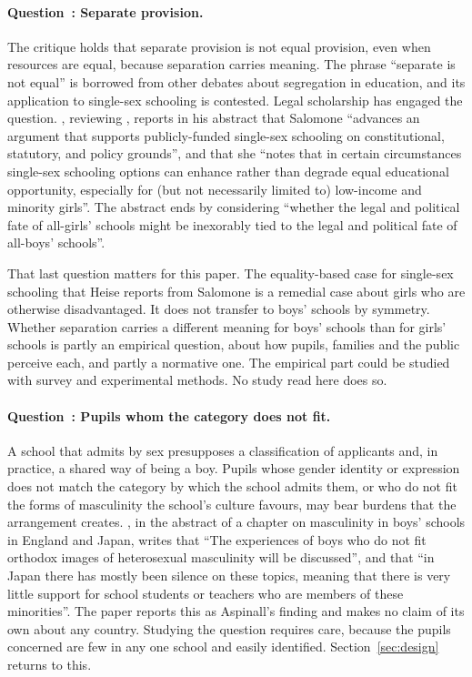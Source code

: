 \documentclass[11pt]{article}
\newcommand{\srcq}[2]{``#2''}
\newcounter{eqq}
\newcommand{\eqq}[1]{\refstepcounter{eqq}\paragraph{Question~\theeqq: #1.}}
\begin{document}
\eqq{Separate provision}\label{eq:separate}
The critique holds that separate provision is not equal provision, even when resources are equal, because separation carries meaning. The phrase ``separate is not equal'' is borrowed from other debates about segregation in education, and its application to single-sex schooling is contested. Legal scholarship has engaged the question. \citet{heise2004}, reviewing \citet{salomone2017}, reports in his abstract that Salomone \srcq{heise2004}{advances an argument that supports publicly-funded single-sex schooling on constitutional, statutory, and policy grounds}, and that she \srcq{heise2004}{notes that in certain circumstances single-sex schooling options can enhance rather than degrade equal educational opportunity, especially for (but not necessarily limited to) low-income and minority girls}. The abstract ends by considering \srcq{heise2004}{whether the legal and political fate of all-girls' schools might be inexorably tied to the legal and political fate of all-boys' schools}.

That last question matters for this paper. The equality-based case for single-sex schooling that Heise reports from Salomone is a remedial case about girls who are otherwise disadvantaged. It does not transfer to boys' schools by symmetry. Whether separation carries a different meaning for boys' schools than for girls' schools is partly an empirical question, about how pupils, families and the public perceive each, and partly a normative one. The empirical part could be studied with survey and experimental methods. No study read here does so.

\eqq{Pupils whom the category does not fit}\label{eq:fit}
A school that admits by sex presupposes a classification of applicants and, in practice, a shared way of being a boy. Pupils whose gender identity or expression does not match the category by which the school admits them, or who do not fit the forms of masculinity the school's culture favours, may bear burdens that the arrangement creates. \citet{aspinall2024three}, in the abstract of a chapter on masculinity in boys' schools in England and Japan, writes that \srcq{aspinall2024three}{The experiences of boys who do not fit orthodox images of heterosexual masculinity will be discussed}, and that \srcq{aspinall2024three}{in Japan there has mostly been silence on these topics, meaning that there is very little support for school students or teachers who are members of these minorities}. The paper reports this as Aspinall's finding and makes no claim of its own about any country. Studying the question requires care, because the pupils concerned are few in any one school and easily identified. Section~\ref{sec:design} returns to this.
\end{document}
